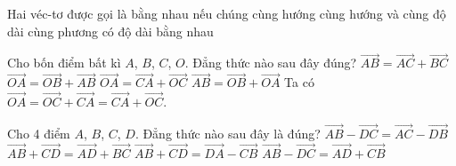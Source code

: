 \begin{ex}%
	Hai véc-tơ được gọi là bằng nhau nếu chúng
	\choice
	{cùng hướng}
	{\True cùng hướng và cùng độ dài}
	{cùng phương}
	{có độ dài bằng nhau}
\end{ex}

\begin{ex}%
	Cho bốn điểm bất kì $A$, $B$, $C$, $O$. Đẳng thức nào sau đây đúng?
	\choice
	{$\overrightarrow{AB}=\overrightarrow{AC}+\overrightarrow{BC}$}
	{$\overrightarrow{OA}=\overrightarrow{OB}+\overrightarrow{AB}$}
	{\True $\overrightarrow{OA}=\overrightarrow{CA}+\overrightarrow{OC}$}
	{$\overrightarrow{AB}=\overrightarrow{OB}+\overrightarrow{OA}$}
	\loigiai
	{
		Ta có $\overrightarrow{OA}=\overrightarrow{OC}+\overrightarrow{CA}=\overrightarrow{CA}+\overrightarrow{OC}$.
	}
\end{ex}

\begin{ex}%
	Cho 4 điểm $A$, $B$, $C$, $D$. Đẳng thức nào sau đây là đúng?
	\choice
	{$\overrightarrow{AB} - \overrightarrow{DC} = \overrightarrow{AC} - \overrightarrow{DB}$}
	{$\overrightarrow{AB} + \overrightarrow{CD} = \overrightarrow{AD} + \overrightarrow{BC}$}
	{$\overrightarrow{AB} + \overrightarrow{CD} = \overrightarrow{DA} - \overrightarrow{CB}$}
	{\True $\overrightarrow{AB} - \overrightarrow{DC} = \overrightarrow{AD} + \overrightarrow{CB}$}
\end{ex}

